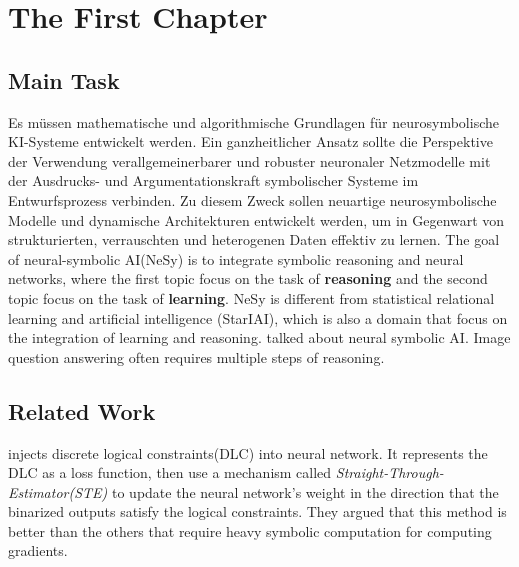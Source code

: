 \chapter{The First Chapter}



\section{Main Task}
Es müssen mathematische und algorithmische Grundlagen für neurosymbolische KI-Systeme entwickelt werden. Ein ganzheitlicher Ansatz sollte die Perspektive der Verwendung verallgemeinerbarer und robuster neuronaler Netzmodelle mit der Ausdrucks- und Argumentationskraft symbolischer Systeme im Entwurfsprozess verbinden. Zu diesem Zweck sollen neuartige neurosymbolische Modelle und dynamische Architekturen entwickelt werden, um in Gegenwart von strukturierten, verrauschten und heterogenen Daten effektiv zu lernen. 
The goal of neural-symbolic AI(NeSy) is to integrate symbolic reasoning and neural networks, where the first topic focus on the task of \textbf{reasoning} and the second topic focus on the task of \textbf{learning}. 
NeSy is different from statistical relational learning and artificial intelligence (StarIAI), which is also a domain that focus on the integration of learning and reasoning.
\cite{Susskind2021} talked about neural symbolic AI.
Image question answering often requires multiple steps of reasoning. \cite{SAN}


\section{Related Work}
\cite{yang22} injects discrete logical constraints(DLC) into neural network. It represents the DLC as a loss function, then use a mechanism called \textit{Straight-Through-Estimator(STE)} to update the neural network's weight in the direction that the binarized outputs satisfy the logical constraints. They argued that this method is better than the others that require heavy symbolic computation for computing gradients.



